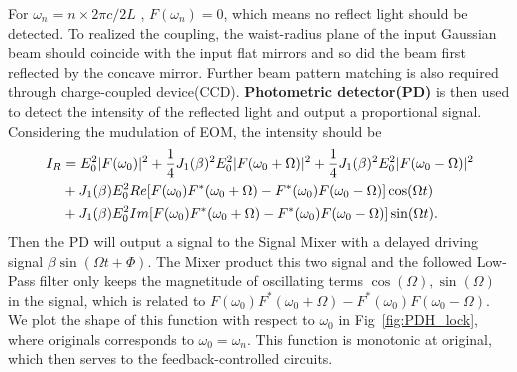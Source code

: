 \documentclass[11pt]{article}
\begin{document}
For $\omega_n = n \times 2\pi c /2L  $ , $F(\omega_n) = 0$, which means no reflect light should be detected. To realized the coupling, the waist-radius plane of the input Gaussian beam should coincide with the input flat mirrors and so did the beam first reflected by the concave mirror. Further beam pattern matching is also required through charge-coupled device(CCD). \textbf{Photometric detector(PD)} is then used to detect the intensity of the reflected light and output a proportional signal. Considering the mudulation of EOM, the intensity should be
\begin{align}
    I_R &= E_0^2 |F(\omega_0)|^2 + \frac{1}{4} J_1(\beta)^2 E_0^2 |F(\omega_0 + \Omega)|^2 + \frac{1}{4} J_1(\beta)^2 E_0^2 |F(\omega_0 - \Omega)|^2 \notag \\
    &+J_1(\beta) E_0^2 Re[F(\omega_0)F^*(\omega_0 + \Omega) - F^*(\omega_0)F(\omega_0 - \Omega)  ] \cos(\Omega t) \notag \\
    &+J_1(\beta) E_0^2 Im[F(\omega_0)F^*(\omega_0 + \Omega) - F^*(\omega_0)F(\omega_0 - \Omega)  ] \sin(\Omega t).
\end{align}
Then the PD will output a signal to the Signal Mixer with a delayed driving signal $\beta \sin(\Omega t + \Phi)$. The Mixer product this two signal and the followed Low-Pass filter only keeps the magnetitude of oscillating terms $\cos(\Omega),\sin(\Omega)$ in the signal, which is related to $F(\omega_0)F^*(\omega_0 + \Omega) - F^*(\omega_0)F(\omega_0 - \Omega)$. We plot the shape of this function with respect to $\omega_0$ in  Fig~\ref{fig:PDH_lock}, where originals corresponds to $\omega_0 = \omega_n$. This function is monotonic at original, which then serves to the feedback-controlled circuits.
\end{document}
